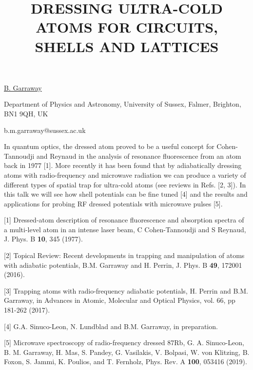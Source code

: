 \title{DRESSING ULTRA-COLD ATOMS FOR CIRCUITS, SHELLS AND LATTICES}

\underline{B. Garraway} 

{\normalsize{\vspace{-4mm}
Department of Physics and Astronomy,
University of Sussex,
Falmer, Brighton, BN1 9QH, UK



\email b.m.garraway@sussex.ac.uk}}

In quantum optics, the dressed atom proved to be a useful concept for Cohen-Tannoudji and Reynaud in the analysis of resonance fluorescence from an atom back in 1977 [1]. More recently it has been found that by adiabatically dressing atoms with radio-frequency and microwave radiation we can produce a variety of different types of spatial trap for ultra-cold atoms (see reviews in Refs. [2, 3]). In this talk we will see how shell potentials can be fine tuned [4] and the results and applications for probing RF dressed potentials with microwave pulses [5].

{\normalsize
[1] Dressed-atom description of resonance fluorescence and absorption spectra of a multi-level atom in an intense laser beam, C Cohen-Tannoudji and S Reynaud, J. Phys. B \textbf{10}, 345 (1977).
\vsp

[2] Topical Review: Recent developments in trapping and manipulation of atoms with adiabatic potentials, B.M. Garraway and H. Perrin, J. Phys. B \textbf{49}, 172001 (2016).
\vsp

[3] Trapping atoms with radio-frequency adiabatic potentials, H. Perrin and B.M. Garraway, in Advances in Atomic, Molecular and Optical Physics, vol. 66, pp 181-262 (2017).
\vsp

[4] G.A. Sinuco-Leon, N. Lundblad and B.M. Garraway, in preparation.
\vsp

[5] Microwave spectroscopy of radio-frequency dressed 87Rb, G. A. Sinuco-Leon, B. M. Garraway, H. Mas, S. Pandey, G. Vasilakis, V. Bolpasi, W. von Klitzing, B. Foxon, S. Jammi, K. Poulios, and T. Fernholz, Phys. Rev. A \textbf{100}, 053416 (2019).
}

\vspace{\baselineskip}